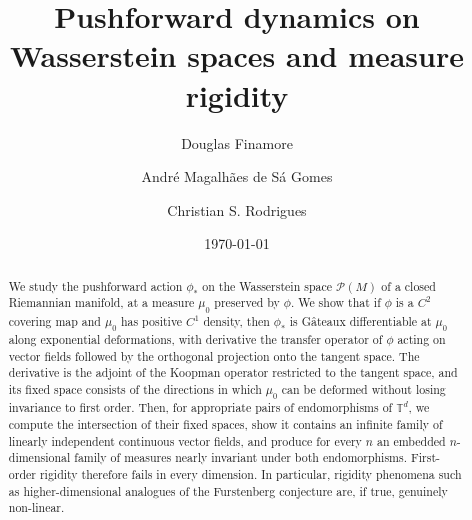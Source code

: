 \documentclass[11pt,reqno]{amsart}
\theoremstyle{plain}
\theoremstyle{definition}
\newcommand{\T}{\mathbb{T}}
\newcommand{\Prob}{\mathcal{P}}
\begin{document}
	
\title[Pushforward dynamics on Wasserstein spaces]
{Pushforward dynamics on Wasserstein spaces and measure rigidity} 
	
\author[D. Finamore]{Douglas Finamore}
    \address{Douglas Finamore \\
        Centro de Matemática, Computação e Cognição - UFABC\\
    	Alameda da Universidade | 09606-405, São Bernardo do Campo, SP, Brazil.}
	
\author[A. Gomes]{Andr\'e Magalh\~aes de S\'a Gomes}
	\address{Andr\'e Magalh\~aes de S\'a Gomes\\
		Instituto de Matemática e Estatística - USP\\
    	Rua do Matão, 1010 | 05508-090, São Paulo, SP, Brazil.}
		
\author[C. Rodrigues]{Christian S. Rodrigues}
	\address{Christian S.~Rodrigues\\
		Instituto de Matemática, Estatística e Computação Científica - UNICAMP\\
    	Rua Sérgio Buarque de Holanda, 651 | 13083-859, Campinas, SP, Brazil,
		and Max-Planck-Institute for Mathematics in the Sciences\\
		Inselstr. 22\\
		04103 Leipzig\\
		Germany
	}
\date{\today}	
	
\begin{abstract}
    We study the pushforward action \( \phi_\ast \) on the Wasserstein space \( \Prob(M) \) of a closed Riemannian manifold, at a measure \( \mu_0 \) preserved by \( \phi \).
    We show that if \( \phi \) is a \( C^2 \) covering map and \( \mu_0 \) has positive \( C^1 \) density, then \( \phi_\ast \) is G\^ateaux differentiable at \( \mu_0 \) along exponential deformations, with derivative the transfer operator of \( \phi \) acting on vector fields followed by the orthogonal projection onto the tangent space.
    The derivative is the adjoint of the Koopman operator restricted to the tangent space, and its fixed space consists of the directions in which \( \mu_0 \) can be deformed without losing invariance to first order.
    Then, for appropriate pairs of endomorphisms of \( \T^d \), we compute the intersection of their fixed spaces, show it contains an infinite family of linearly independent continuous vector fields, and produce for every \( n \) an embedded \( n \)-dimensional family of measures nearly invariant under both endomorphisms.
    First-order rigidity therefore fails in every dimension.
    In particular, rigidity phenomena such as higher-dimensional analogues of the Furstenberg conjecture are, if true, genuinely non-linear.
\end{abstract}	
	
\end{document}
